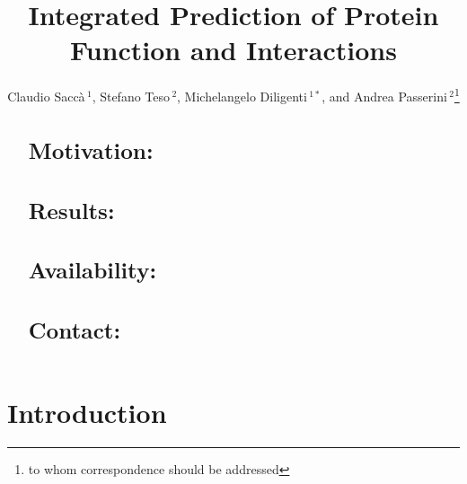 \documentclass{bioinfo}
\begin{document}

\title[short Title]{Integrated Prediction of Protein Function and Interactions}
\author[Sample \textit{et~al}]{Claudio Sacc\`a\,$^{1}$, Stefano Teso\,$^{2}$, Michelangelo Diligenti\,$^{1*}$, and Andrea Passerini\,$^2$\footnote{to whom correspondence should be addressed}}
\address{
    $^{1}$Dipartimento di Ingegneria dell'Informazione e Scienze Matematiche, University of Siena, Siena, Italy\\
    $^{2}$Dipartimento di Ingegneria e Scienza dell'Informazione, University of Trento, Trento, Italy
}

\maketitle



\begin{abstract}
\section{Motivation:}
\section{Results:}
\section{Availability:}
\section{Contact:}
\end{abstract}



\section{Introduction}
\end{document}
